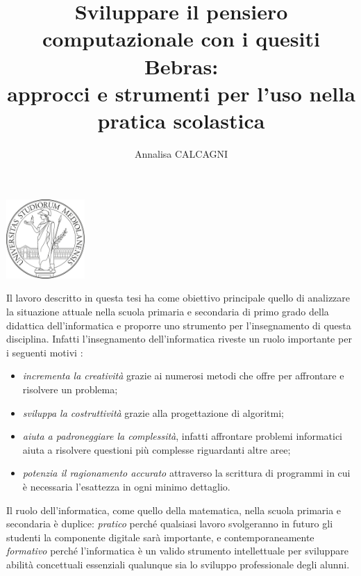 \documentclass[12pt]{report}
\begin{document}
\begin{center}
	\includegraphics[height=3.0cm]{logo_unimi.png}
\end{center}


\title {\textbf{Sviluppare il pensiero \\[1mm]computazionale con i quesiti Bebras: \\[1mm]approcci e strumenti per l'uso nella \\[1mm]pratica scolastica\\[1mm]}} 
\author{Annalisa CALCAGNI}
%
%

\beforepreface


% 
\afterpreface
\doublespacing
%

Il lavoro descritto in questa tesi ha come obiettivo principale quello di analizzare la situazione attuale nella scuola primaria e secondaria di primo grado della didattica dell'informatica e proporre uno strumento per l'insegnamento di questa disciplina.
Infatti l'insegnamento dell'informatica riveste un ruolo importante per i seguenti motivi \cite{InformaticaScuola}:
\begin{itemize}
	\item \textit{incrementa la creatività} grazie ai numerosi metodi che offre per affrontare e risolvere un problema;
	\item \textit{sviluppa la costruttività} grazie alla progettazione di algoritmi;
	\item \textit{aiuta a padroneggiare la complessità}, infatti affrontare problemi informatici aiuta a risolvere questioni più complesse riguardanti altre aree;
	\item \textit{potenzia il ragionamento accurato} attraverso la scrittura di programmi in cui è necessaria l'esattezza in ogni minimo dettaglio.
\end{itemize}
Il ruolo dell'informatica, come quello della matematica, nella scuola primaria e secondaria è duplice: \textit{pratico} perché qualsiasi lavoro svolgeranno in futuro gli studenti la componente digitale sarà importante, e contemporaneamente \textit{formativo} perché l'informatica è un valido strumento intellettuale per sviluppare abilità concettuali essenziali qualunque sia lo sviluppo professionale degli alunni.
\end{document}
